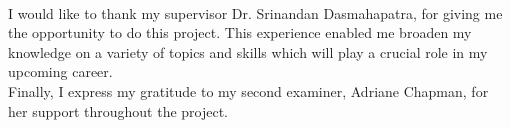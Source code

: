 

\begin{acknowledgements}
\\
I would like to thank my supervisor Dr. Srinandan Dasmahapatra, for giving me the opportunity to do this project. This experience enabled me broaden my knowledge on a variety of topics and skills which will play a crucial role in my upcoming career. \\

Finally, I express my gratitude to my second examiner, Adriane Chapman, for her support throughout the project. 

\end{acknowledgements}
